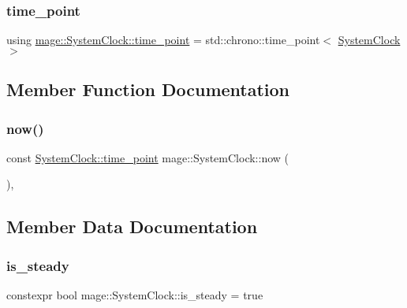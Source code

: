 \subsubsection{\texorpdfstring{time\+\_\+point}{time\_point}}
{\footnotesize\ttfamily using \hyperlink{structmage_1_1_system_clock_a00c052d5e1349785a6847fbfb9e1f044}{mage\+::\+System\+Clock\+::time\+\_\+point} =  std\+::chrono\+::time\+\_\+point$<$ \hyperlink{structmage_1_1_system_clock}{System\+Clock} $>$}



\subsection{Member Function Documentation}
\hypertarget{structmage_1_1_system_clock_a581ad90223253218d61c5d6c32da112a}{}\label{structmage_1_1_system_clock_a581ad90223253218d61c5d6c32da112a} 
\subsubsection{\texorpdfstring{now()}{now()}}
{\footnotesize\ttfamily const \hyperlink{structmage_1_1_system_clock_a00c052d5e1349785a6847fbfb9e1f044}{System\+Clock\+::time\+\_\+point} mage\+::\+System\+Clock\+::now (\begin{DoxyParamCaption}{ }\end{DoxyParamCaption})\hspace{0.3cm}{\ttfamily [static]}, {\ttfamily [noexcept]}}



\subsection{Member Data Documentation}
\hypertarget{structmage_1_1_system_clock_ad7cdec95a6032ab973ed02da26ddd3f0}{}\label{structmage_1_1_system_clock_ad7cdec95a6032ab973ed02da26ddd3f0} 
\subsubsection{\texorpdfstring{is\+\_\+steady}{is\_steady}}
{\footnotesize\ttfamily constexpr bool mage\+::\+System\+Clock\+::is\+\_\+steady = true\hspace{0.3cm}{\ttfamily [static]}}

